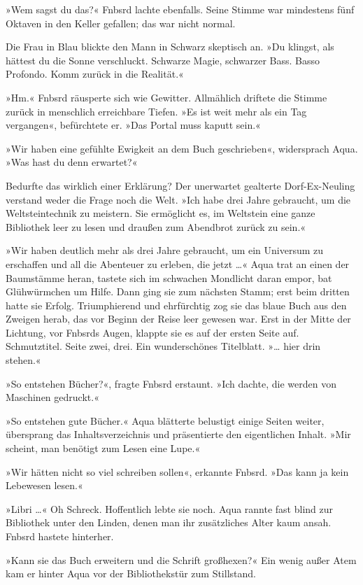 »Wem sagst du das?« Fnbsrd lachte ebenfalls. Seine Stimme war mindestens fünf Oktaven in den Keller gefallen; das war nicht normal.

Die Frau in Blau blickte den Mann in Schwarz skeptisch an. »Du klingst, als hättest du die Sonne verschluckt. Schwarze Magie, schwarzer Bass. Basso Profondo. Komm zurück in die Realität.«

»Hm.« Fnbsrd räusperte sich wie Gewitter. Allmählich driftete die Stimme zurück in menschlich erreichbare Tiefen. »Es ist weit mehr als ein Tag vergangen«, befürchtete er. »Das Portal muss kaputt sein.«

»Wir haben eine gefühlte Ewigkeit an dem Buch geschrieben«, widersprach Aqua. »Was hast du denn erwartet?«

Bedurfte das wirklich einer Erklärung? Der unerwartet gealterte Dorf-Ex-Neuling verstand weder die Frage noch die Welt. »Ich habe drei Jahre gebraucht, um die Weltsteintechnik zu meistern. Sie ermöglicht es, im Weltstein eine ganze Bibliothek leer zu lesen und draußen zum Abendbrot zurück zu sein.«

»Wir haben deutlich mehr als drei Jahre gebraucht, um ein Universum zu erschaffen und all die Abenteuer zu erleben, die jetzt …« Aqua trat an einen der Baumstämme heran, tastete sich im schwachen Mondlicht daran empor, bat Glühwürmchen um Hilfe. Dann ging sie zum nächsten Stamm; erst beim dritten hatte sie Erfolg. Triumphierend und ehrfürchtig zog sie das blaue Buch aus den Zweigen herab, das vor Beginn der Reise leer gewesen war. Erst in der Mitte der Lichtung, vor Fnbsrds Augen, klappte sie es auf der ersten Seite auf. Schmutztitel. Seite zwei, drei. Ein wunderschönes Titelblatt. »… hier drin stehen.«

»So entstehen Bücher?«, fragte Fnbsrd erstaunt. »Ich dachte, die werden von Maschinen gedruckt.«

»So entstehen gute Bücher.« Aqua blätterte belustigt einige Seiten weiter, übersprang das Inhaltsverzeichnis und präsentierte den eigentlichen Inhalt. »Mir scheint, man benötigt zum Lesen eine Lupe.«

»Wir hätten nicht so viel schreiben sollen«, erkannte Fnbsrd. »Das kann ja kein Lebewesen lesen.«

»Libri …« Oh Schreck. Hoffentlich lebte sie noch. Aqua rannte fast blind zur Bibliothek unter den Linden, denen man ihr zusätzliches Alter kaum ansah. Fnbsrd hastete hinterher.

»Kann sie das Buch erweitern und die Schrift großhexen?« Ein wenig außer Atem kam er hinter Aqua vor der Bibliothekstür zum Stillstand.

